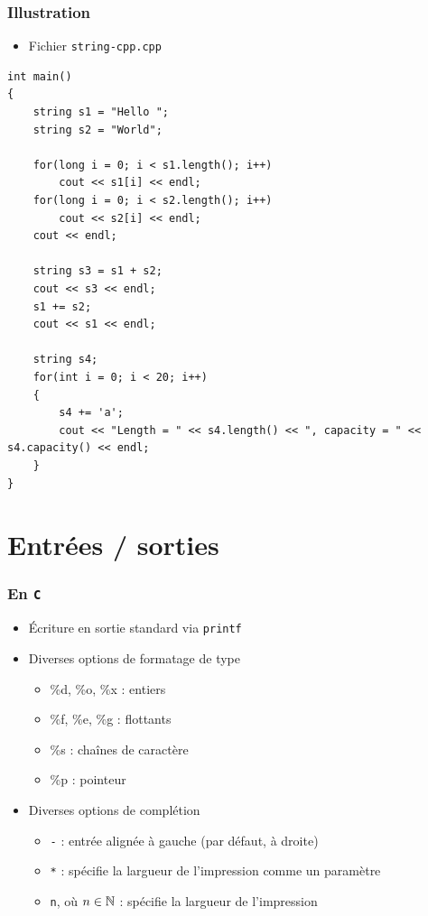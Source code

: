 \begin{frame}[containsverbatim]
\frametitle{Illustration}
\begin{itemize}
\item Fichier \texttt{string-cpp.cpp}
\end{itemize}
\begin{lstlisting}
int main()
{
	string s1 = "Hello ";
	string s2 = "World";

	for(long i = 0; i < s1.length(); i++)
		cout << s1[i] << endl;
	for(long i = 0; i < s2.length(); i++)
		cout << s2[i] << endl;
	cout << endl;

	string s3 = s1 + s2;
	cout << s3 << endl;	
	s1 += s2;
	cout << s1 << endl;

	string s4;
	for(int i = 0; i < 20; i++)
	{
		s4 += 'a';
		cout << "Length = " << s4.length() << ", capacity = " << s4.capacity() << endl;		
	}
}
\end{lstlisting}
\end{frame}

\section{Entrées / sorties}

\begin{frame}
\frametitle{En \texttt{C}}
\begin{itemize}[<+->]
\item Écriture en sortie standard via \texttt{printf}
\item Diverses options de formatage de type
	\begin{itemize}
	\item \%d, \%o, \%x : entiers
	\item \%f, \%e, \%g : flottants
	\item \%s : chaînes de caractère
	\item \%p : pointeur
	\end{itemize}
\item Diverses options de complétion
	\begin{itemize}
	\item \texttt{-} : entrée alignée à gauche (par défaut, à droite)
	\item \texttt{*} : spécifie la largueur de l'impression comme un paramètre
	\item \texttt{n}, où $n \in {\mathbb N}$ : spécifie la largueur de l'impression
	\end{itemize}
\end{itemize}
\end{frame}

